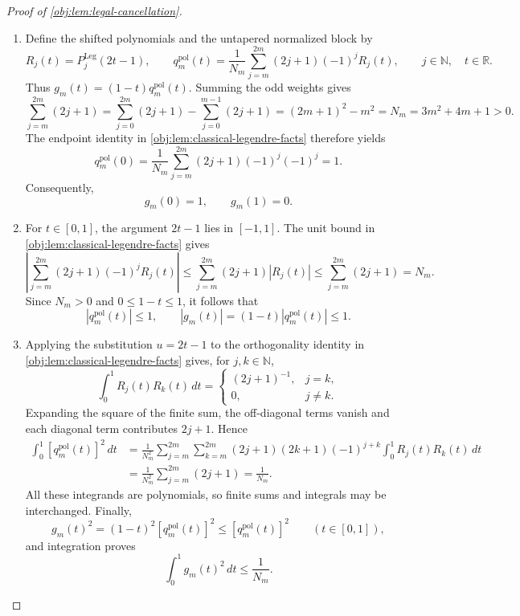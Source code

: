 \begin{proof}[Proof of \cref{obj:lem:legal-cancellation}]
\begin{enumerate}
\item Define the shifted polynomials and the untapered normalized block by
\[
R_j(t)=P_j^{\mathrm{Leg}}(2t-1),
\qquad
q_m^{\mathrm{pol}}(t)
=\frac1{N_m}\sum_{j=m}^{2m}(2j+1)(-1)^jR_j(t),
\qquad j\in\mathbb N,\quad t\in\mathbb R.
\]
Thus \(g_m(t)=(1-t)q_m^{\mathrm{pol}}(t)\). Summing the odd weights gives
\[
\sum_{j=m}^{2m}(2j+1)
=\sum_{j=0}^{2m}(2j+1)-\sum_{j=0}^{m-1}(2j+1)
=(2m+1)^2-m^2
=N_m=3m^2+4m+1>0.
\]
The endpoint identity in \cref{obj:lem:classical-legendre-facts} therefore yields
\[
q_m^{\mathrm{pol}}(0)
=\frac1{N_m}\sum_{j=m}^{2m}(2j+1)(-1)^j(-1)^j
=1.
\]
Consequently,
\[
g_m(0)=1,\qquad g_m(1)=0.
\]

\item For \(t\in[0,1]\), the argument \(2t-1\) lies in \([-1,1]\). The unit bound in \cref{obj:lem:classical-legendre-facts} gives
\[
\left|\sum_{j=m}^{2m}(2j+1)(-1)^jR_j(t)\right|
\le\sum_{j=m}^{2m}(2j+1)|R_j(t)|
\le\sum_{j=m}^{2m}(2j+1)=N_m.
\]
Since \(N_m>0\) and \(0\le1-t\le1\), it follows that
\[
|q_m^{\mathrm{pol}}(t)|\le1,
\qquad
|g_m(t)|=(1-t)|q_m^{\mathrm{pol}}(t)|\le1.
\]

\item Applying the substitution \(u=2t-1\) to the orthogonality identity in \cref{obj:lem:classical-legendre-facts} gives, for \(j,k\in\mathbb N\),
\[
\int_0^1R_j(t)R_k(t)\,dt
=
\begin{cases}
(2j+1)^{-1},&j=k,\\
0,&j\ne k.
\end{cases}
\]
Expanding the square of the finite sum, the off-diagonal terms vanish and each diagonal term contributes \(2j+1\). Hence
\[
\begin{aligned}
\int_0^1[q_m^{\mathrm{pol}}(t)]^2\,dt
&=\frac1{N_m^2}
\sum_{j=m}^{2m}\sum_{k=m}^{2m}
(2j+1)(2k+1)(-1)^{j+k}
\int_0^1R_j(t)R_k(t)\,dt\\
&=\frac1{N_m^2}\sum_{j=m}^{2m}(2j+1)
=\frac1{N_m}.
\end{aligned}
\]
All these integrands are polynomials, so finite sums and integrals may be interchanged. Finally,
\[
g_m(t)^2=(1-t)^2[q_m^{\mathrm{pol}}(t)]^2
\le[q_m^{\mathrm{pol}}(t)]^2
\qquad(t\in[0,1]),
\]
and integration proves
\[
\int_0^1g_m(t)^2\,dt\le\frac1{N_m}.
\]


\end{enumerate}
\end{proof}
